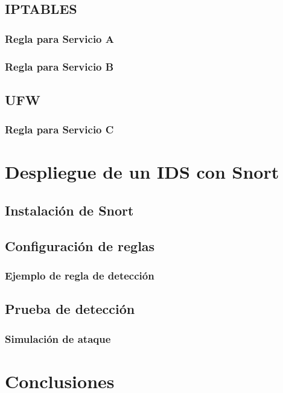 \documentclass[12pt,a4paper]{article}
\begin{document}
\subsection{IPTABLES}
\subsubsection{Regla para Servicio A}

\subsubsection{Regla para Servicio B}

\subsection{UFW}
\subsubsection{Regla para Servicio C}

\section{Despliegue de un IDS con Snort}
\subsection{Instalación de Snort}

\subsection{Configuración de reglas}
\subsubsection{Ejemplo de regla de detección}

\subsection{Prueba de detección}
\subsubsection{Simulación de ataque}

\section{Conclusiones}
\end{document}
